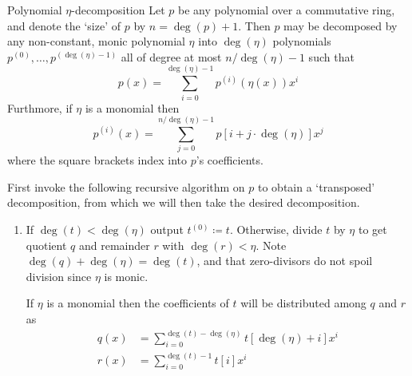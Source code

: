 
\begin{theorem}{Polynomial $\eta$-decomposition}
    Let $p$ be any polynomial over a commutative ring, and denote the `size' of $p$ by $n=\deg(p)+1$.
    Then $p$ may be decomposed by any non-constant, monic polynomial $\eta$ into $\deg(\eta)$ polynomials $p^{(0)},\dots,p^{(\deg(\eta)-1)}$ all of degree at most $n/\deg(\eta)-1$ such that
    \begin{equation}
        p(x) = \sum_{i=0}^{\deg(\eta)-1} p^{(i)}(\eta(x))x^i
    \end{equation}
    Furthmore, if $\eta$ is a monomial then 
    \begin{equation}
        p^{(i)}(x) = \sum_{j=0}^{n/\deg(\eta)-1} p[i+j\cdot\deg(\eta)]x^j
    \end{equation}
    where the square brackets index into $p$'s coefficients.

    \proof
    First invoke the following recursive algorithm on $p$ to obtain a `transposed' decomposition, from which we will then take the desired decomposition.

    \begin{enumerate}
        \begin{itemize}[square]
            \item
             polynomial $t$. Let $n_t=\deg(t)+1$
            \item
             polynomials $t^{(0)},\dots,t^{(\ceil{n_t/\eta}-1)}$ with $\deg(t^{(i)})<\deg(\eta)$ for all $i$ such that
            \begin{align}
                t(x) = \sum_{i=0}^{\ceil{n_t/\deg(\eta)}-1} t^{(i)}(x)\eta(x)^i
            \end{align}
            Furthermore, if $\eta$ is a monomial then
            \begin{equation}
                t^{(i)} = \sum_{j=0}^{\deg(\eta)-1} t[j+i\cdot\deg(\eta)]x^j\tag{1}\label{t-form}
            \end{equation}
        \end{itemize}

        \item
        If $\deg(t)<\deg(\eta)$ output $t^{(0)}\coloneqq t$.
        Otherwise, divide $t$ by $\eta$ to get quotient $q$ and remainder $r$ with $\deg(r)<\eta$.
        Note $\deg(q)+\deg(\eta) = \deg(t)$, and that zero-divisors do not spoil division since $\eta$ is monic.

        If $\eta$ is a monomial then the coefficients of $t$ will be distributed among $q$ and $r$ as
        \begin{align}
            q(x) &= \sum_{i=0}^{\deg(t)-\deg(\eta)} t[\deg(\eta)+i]x^i \tag{2}\label{q-form} \\
            r(x) &= \sum_{i=0}^{\deg(t)-1} t[i]x^i \tag{3}\label{r-form}
        \end{align}


\end{enumerate}
\end{theorem}
